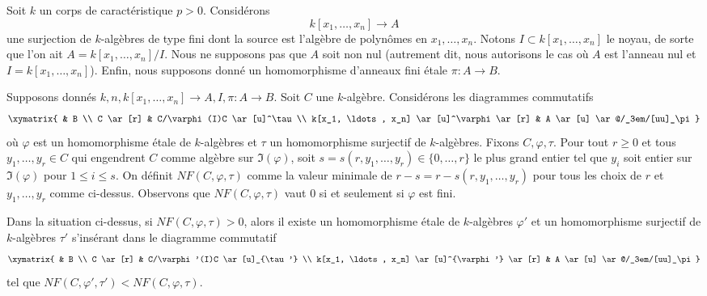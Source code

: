 \medskip\noindent
Soit $k$ un corps de caractéristique $p > 0$.
Considérons
$$
k[x_1, \ldots, x_n] \longrightarrow A
$$
une surjection de $k$-algèbres de type fini dont la source est
l'algèbre de polynômes en $x_1, \ldots, x_n$. Notons
$I \subset k[x_1, \ldots, x_n]$ le noyau, de sorte que l'on ait
$A = k[x_1, \ldots, x_n]/I$. Nous ne supposons pas que $A$ soit non nul
(autrement dit, nous autorisons le cas où $A$ est l'anneau nul
et $I = k[x_1, \ldots, x_n]$). Enfin, nous supposons donné un
homomorphisme d'anneaux fini \'etale $\pi : A \to B$.

\medskip\noindent
Supposons donnés $k, n, k[x_1, \ldots, x_n] \to A, I, \pi : A \to B$.
Soit $C$ une $k$-algèbre. Considérons les
diagrammes commutatifs
$$
\xymatrix{
& B \\
C \ar[r] & C/\varphi(I)C \ar[u]^\tau \\
k[x_1, \ldots, x_n] \ar[u]^\varphi \ar[r] &
A \ar[u] \ar@/_3em/[uu]_\pi
}
$$
où $\varphi$ est un homomorphisme \'etale de $k$-algèbres et $\tau$ un
homomorphisme surjectif de $k$-algèbres.
Fixons $C, \varphi, \tau$. Pour tout $r \geq 0$ et tous
$y_1, \ldots, y_r \in C$ qui engendrent $C$ comme algèbre sur
$\Im(\varphi)$, soit $s = s(r, y_1, \ldots, y_r) \in \{0, \ldots, r\}$
le plus grand entier tel que $y_i$ soit entier sur $\Im(\varphi)$
pour $1 \leq i \leq s$. On définit $NF(C, \varphi, \tau)$
comme la valeur minimale de
$r - s = r - s(r, y_1, \ldots, y_r)$ pour tous les choix de
$r$ et $y_1, \ldots, y_r$ comme ci-dessus.
Observons que $NF(C, \varphi, \tau)$ vaut $0$ si et seulement si $\varphi$ est fini.

\begin{lemma}
\label{lemma-lower-invariant}
Dans la situation ci-dessus, si $NF(C, \varphi, \tau) > 0$, alors il existe
un homomorphisme \'etale de $k$-algèbres $\varphi'$ et un homomorphisme surjectif de $k$-algèbres
$\tau'$ s'insérant dans le diagramme commutatif
$$
\xymatrix{
& B \\
C \ar[r] & C/\varphi'(I)C \ar[u]_{\tau'} \\
k[x_1, \ldots, x_n] \ar[u]^{\varphi'} \ar[r] &
A \ar[u] \ar@/_3em/[uu]_\pi
}
$$
tel que $NF(C, \varphi', \tau') < NF(C, \varphi, \tau)$.
\end{lemma}

